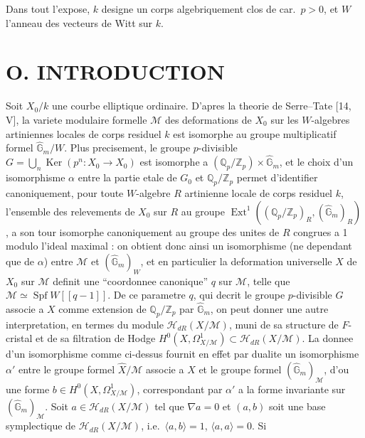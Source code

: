 \documentclass[12pt,a4paper]{article}
\theoremstyle{plain}
\theoremstyle{definition}
\theoremstyle{remark}
\DeclareMathOperator{\Spf}{Spf}
\DeclareMathOperator{\Ker}{Ker}
\DeclareMathOperator{\Ext}{Ext}
\begin{document}
\medskip
Dans tout l'expose, $k$ designe un corps algebriquement clos de car.\ $p > 0$, et $W$ l'anneau des vecteurs de Witt sur $k$.

\newpage
\setcounter{page}{81}

\section*{O. INTRODUCTION}

Soit $X_0/k$ une courbe elliptique ordinaire. D'apres la theorie de Serre--Tate [14, V], la variete modulaire formelle $\mathcal{M}$ des deformations de $X_0$ sur les $W$-algebres artiniennes locales de corps residuel $k$ est isomorphe au groupe multiplicatif formel $\widehat{\mathbb{G}}_m/W$. Plus precisement, le groupe $p$-divisible $G = \bigcup_n \Ker(p^n : X_0 \to X_0)$ est isomorphe a $(\mathbb{Q}_p/\mathbb{Z}_p) \times \widehat{\mathbb{G}}_m$, et le choix d'un isomorphisme $\alpha$ entre la partie etale de $G_0$ et $\mathbb{Q}_p/\mathbb{Z}_p$ permet d'identifier canoniquement, pour toute $W$-algebre $R$ artinienne locale de corps residuel $k$, l'ensemble des relevements de $X_0$ sur $R$ au groupe $\Ext^1((\mathbb{Q}_p/\mathbb{Z}_p)_R, (\widehat{\mathbb{G}}_m)_R)$, a son tour isomorphe canoniquement au groupe des unites de $R$ congrues a 1 modulo l'ideal maximal : on obtient donc ainsi un isomorphisme (ne dependant que de $\alpha$) entre $\mathcal{M}$ et $(\widehat{\mathbb{G}}_m)_W$, et en particulier la deformation universelle $X$ de $X_0$ sur $\mathcal{M}$ definit une ``coordonnee canonique'' $q$ sur $\mathcal{M}$, telle que $\mathcal{M} \simeq \Spf W[[q-1]]$. De ce parametre $q$, qui decrit le groupe $p$-divisible $G$ associe a $X$ comme extension de $\mathbb{Q}_p/\mathbb{Z}_p$ par $\widehat{\mathbb{G}}_m$, on peut donner une autre interpretation, en termes du module $\mathcal{H}_{dR}(X/\mathcal{M})$, muni de sa structure de $F$-cristal et de sa filtration de Hodge $H^0(X,\Omega^1_{X/\mathcal{M}}) \subset \mathcal{H}_{dR}(X/\mathcal{M})$. La donnee d'un isomorphisme comme ci-dessus fournit en effet par dualite un isomorphisme $\alpha'$ entre le groupe formel $\widehat{X}/\mathcal{M}$ associe a $X$ et le groupe formel $(\widehat{\mathbb{G}}_m)_{\mathcal{M}}$, d'ou une forme $b \in H^0(X,\Omega^1_{X/\mathcal{M}})$, correspondant par $\alpha'$ a la forme invariante sur $(\widehat{\mathbb{G}}_m)_{\mathcal{M}}$. Soit $a \in \mathcal{H}_{dR}(X/\mathcal{M})$ tel que $\nabla a = 0$ et $(a,b)$ soit une base symplectique de $\mathcal{H}_{dR}(X/\mathcal{M})$, i.e.\ $\langle a,b \rangle = 1$, $\langle a,a \rangle = 0$. Si
\end{document}
